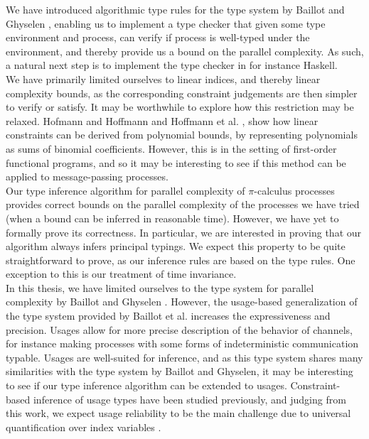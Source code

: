 We have introduced algorithmic type rules for the type system by Baillot and Ghyselen \cite{BaillotGhyselen2021}, enabling us to implement a type checker that given some type environment and process, can verify if process is well-typed under the environment, and thereby provide us a bound on the parallel complexity. As such, a natural next step is to implement the type checker in for instance Haskell.\\

We have primarily limited ourselves to linear indices, and thereby linear complexity bounds, as the corresponding constraint judgements are then simpler to verify or satisfy. It may be worthwhile to explore how this restriction may be relaxed. Hofmann and Hoffmann \cite{HofmannAndHoffmann2010} and Hoffmann et al. \cite{HoffmannEtAl2012}, show how linear constraints can be derived from polynomial bounds, by representing polynomials as sums of binomial coefficients. However, this is in the setting of first-order functional programs, and so it may be interesting to see if this method can be applied to message-passing processes.\\

Our type inference algorithm for parallel complexity of $\pi$-calculus processes provides correct bounds on the parallel complexity of the processes we have tried (when a bound can be inferred in reasonable time). However, we have yet to formally prove its correctness. In particular, we are interested in proving that our algorithm always infers principal typings. We expect this property to be quite straightforward to prove, as our inference rules are based on the type rules. One exception to this is our treatment of time invariance.\\


In this thesis, we have limited ourselves to the type system for parallel complexity by Baillot and Ghyselen \cite{BaillotGhyselen2021}. However, the usage-based generalization of the type system provided by Baillot et al. \cite{BaillotEtAl2021} increases the expressiveness and precision. Usages allow for more precise description of the behavior of channels, for instance making processes with some forms of indeterministic communication typable. Usages are well-suited for inference, and as this type system shares many similarities with the type system by Baillot and Ghyselen, it may be interesting to see if our type inference algorithm can be extended to usages. Constraint-based inference of usage types have been studied previously, and judging from this work, we expect usage reliability to be the main challenge due to universal quantification over index variables \cite{KobayashiEtAl2000, Kobayashi2005}.

